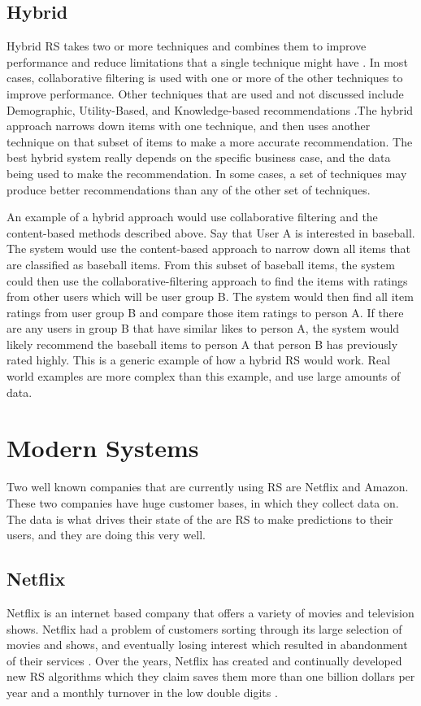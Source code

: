 \documentclass[sigconf]{acmart}
\begin{document}
\subsection{Hybrid}
Hybrid RS takes two or more techniques and combines them to improve performance and reduce limitations that a single technique might have \cite{Burke2002}. In most cases, collaborative filtering is used with one or more of the other techniques to improve performance. Other techniques that are used and not discussed include Demographic, Utility-Based, and Knowledge-based recommendations \cite{Burke2002}.The hybrid approach narrows down items with one technique, and then uses another technique on that subset of items to make a more accurate recommendation. The best hybrid system really depends on the specific business case, and the data being used to make the recommendation. In some cases, a set of techniques may produce better recommendations than any of the other set of techniques.

An example of a hybrid approach would use collaborative filtering and the content-based methods described above. Say that User A is interested in baseball. The system would use the content-based approach to narrow down all items that are classified as baseball items. From this subset of baseball items, the system could then use the collaborative-filtering approach to find the items with ratings from other users which will be user group B. The system would then find all item ratings from user group B and compare those item ratings to person A. If there are any users in group B that have similar likes to person A, the system would likely recommend the baseball items to person A that person B has previously rated highly. This is a generic example of how a hybrid RS would work. Real world examples are more complex than this example, and use large amounts of data.


\section{Modern Systems}
Two well known companies that are currently using RS are Netflix and Amazon. These two companies have huge customer bases, in which they collect data on. The data is what drives their state of the are RS to make predictions to their users, and they are doing this very well.

\subsection{Netflix}
Netflix is an internet based company that offers a variety of movies and television shows. Netflix had a problem of customers sorting through its large selection of movies and shows, and eventually losing interest which resulted in abandonment of their services \cite{Gomez-Uribe2015}. Over the years, Netflix has created and continually developed new RS algorithms which they claim saves them more than one billion dollars per year and a monthly turnover in the low double digits \cite{Gomez-Uribe2015}. 
\end{document}

